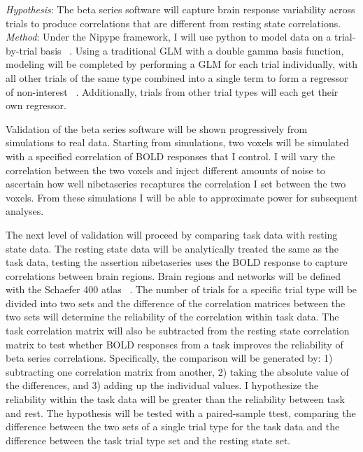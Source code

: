 \documentclass[phd,appendix,figures]{uithesis}
\begin{document}
\newline
\newline
\textit{Hypothesis}:
The beta series software will capture brain response variability across trials to produce correlations that are different from resting state correlations.
\newline
\newline
\textit{Method}:
Under the Nipype framework, I will use python to model data on a trial-by-trial basis ~\citep{Smith2004,Gorgolewski2017}. 
Using a traditional GLM with a double gamma basis function, modeling will be completed by performing a GLM for each trial individually, with all other trials of the same type combined into a single term to form a regressor of non-interest ~\citep{Mumford2012}.
Additionally, trials from other trial types will each get their own regressor.

Validation of the beta series software will be shown progressively from simulations to real data.
Starting from simulations, two voxels will be simulated with a specified correlation of BOLD responses that I control.
I will vary the correlation between the two voxels and inject different amounts of noise to ascertain how well nibetaseries recaptures the correlation I set between the two voxels.
From these simulations I will be able to approximate power for subsequent analyses.
 
The next level of validation will proceed by comparing task data with resting state data.
The resting state data will be analytically treated the same as the task data, testing the assertion nibetaseries uses the BOLD response to capture correlations between brain regions.
Brain regions and networks will be defined with the Schaefer 400 atlas ~\citep{schaefer2017}.
The number of trials for a specific trial type will be divided into two sets and the difference of the correlation matrices between the two sets will determine the reliability of the correlation within task data.
The task correlation matrix will also be subtracted from the resting state correlation matrix to test whether BOLD responses from a task improves the reliability of beta series correlations.
Specifically, the comparison will be generated by: 1) subtracting one correlation matrix from another, 2) taking the absolute value of the differences, and 3) adding up the individual values.
I hypothesize the reliability within the task data will be greater than the reliability between task and rest.
The hypothesis will be tested with a paired-sample ttest, comparing the difference between the two sets of a single trial type for the task data and the difference between the task trial type set and the resting state set.
 
\end{document}
